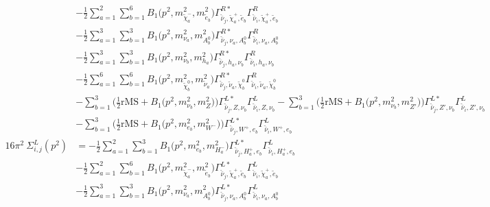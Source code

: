 \begin{itemize}
\begin{align}
 &-\frac{1}{2} \sum_{a=1}^{2}\sum_{b=1}^{6}{B_1\Big(p^{2},m^2_{\tilde{\chi}^-_{{a}}},m^2_{\tilde{e}_{{b}}}\Big)} {\Gamma^{R*}_{\check{\bar{\nu}}_{{j}},\tilde{\chi}^+_{{a}},\tilde{e}_{{b}}}} {\Gamma^R_{\check{\bar{\nu}}_{{i}},\tilde{\chi}^+_{{a}},\tilde{e}_{{b}}}}  \nonumber \\ 
 &-\frac{1}{2} \sum_{a=1}^{3}\sum_{b=1}^{3}{B_1\Big(p^{2},m^2_{\nu_{{a}}},m^2_{A^0_{{b}}}\Big)} {\Gamma^{R*}_{\check{\bar{\nu}}_{{j}},\nu_{{a}},A^0_{{b}}}} {\Gamma^R_{\check{\bar{\nu}}_{{i}},\nu_{{a}},A^0_{{b}}}}  \nonumber \\ 
 &-\frac{1}{2} \sum_{a=1}^{3}\sum_{b=1}^{3}{B_1\Big(p^{2},m^2_{\nu_{{b}}},m^2_{h_{{a}}}\Big)} {\Gamma^{R*}_{\check{\bar{\nu}}_{{j}},h_{{a}},\nu_{{b}}}} {\Gamma^R_{\check{\bar{\nu}}_{{i}},h_{{a}},\nu_{{b}}}}  \nonumber \\ 
 &-\frac{1}{2} \sum_{a=1}^{6}\sum_{b=1}^{6}{B_1\Big(p^{2},m^2_{\tilde{\chi}^0_{{b}}},m^2_{\tilde{\nu}_{{a}}}\Big)} {\Gamma^{R*}_{\check{\bar{\nu}}_{{j}},\tilde{\nu}_{{a}},\tilde{\chi}^0_{{b}}}} {\Gamma^R_{\check{\bar{\nu}}_{{i}},\tilde{\nu}_{{a}},\tilde{\chi}^0_{{b}}}}  \nonumber \\ 
 &- \sum_{b=1}^{3}\Big(\frac{1}{2} \text{rMS}  + {B_1\Big(p^{2},m^2_{\nu_{{b}}},m^2_{Z}\Big)}\Big){\Gamma^{L*}_{\check{\bar{\nu}}_{{j}},Z,\nu_{{b}}}} {\Gamma^L_{\check{\bar{\nu}}_{{i}},Z,\nu_{{b}}}}  - \sum_{b=1}^{3}\Big(\frac{1}{2} \text{rMS}  + {B_1\Big(p^{2},m^2_{\nu_{{b}}},m^2_{{Z'}}\Big)}\Big){\Gamma^{L*}_{\check{\bar{\nu}}_{{j}},{Z'},\nu_{{b}}}} {\Gamma^L_{\check{\bar{\nu}}_{{i}},{Z'},\nu_{{b}}}}  \nonumber \\ 
 &- \sum_{b=1}^{3}\Big(\frac{1}{2} \text{rMS}  + {B_1\Big(p^{2},m^2_{e_{{b}}},m^2_{W^-}\Big)}\Big){\Gamma^{L*}_{\check{\bar{\nu}}_{{j}},W^+,e_{{b}}}} {\Gamma^L_{\check{\bar{\nu}}_{{i}},W^+,e_{{b}}}}  \\ 
16\pi^2 \ \Sigma^L_{i,j}(p^2) &= -\frac{1}{2} \sum_{a=1}^{2}\sum_{b=1}^{3}{B_1\Big(p^{2},m^2_{e_{{b}}},m^2_{H^-_{{a}}}\Big)} {\Gamma^{L*}_{\check{\bar{\nu}}_{{j}},H^+_{{a}},e_{{b}}}} {\Gamma^L_{\check{\bar{\nu}}_{{i}},H^+_{{a}},e_{{b}}}}  \nonumber \\ 
 &-\frac{1}{2} \sum_{a=1}^{2}\sum_{b=1}^{6}{B_1\Big(p^{2},m^2_{\tilde{\chi}^-_{{a}}},m^2_{\tilde{e}_{{b}}}\Big)} {\Gamma^{L*}_{\check{\bar{\nu}}_{{j}},\tilde{\chi}^+_{{a}},\tilde{e}_{{b}}}} {\Gamma^L_{\check{\bar{\nu}}_{{i}},\tilde{\chi}^+_{{a}},\tilde{e}_{{b}}}}  \nonumber \\ 
 &-\frac{1}{2} \sum_{a=1}^{3}\sum_{b=1}^{3}{B_1\Big(p^{2},m^2_{\nu_{{a}}},m^2_{A^0_{{b}}}\Big)} {\Gamma^{L*}_{\check{\bar{\nu}}_{{j}},\nu_{{a}},A^0_{{b}}}} {\Gamma^L_{\check{\bar{\nu}}_{{i}},\nu_{{a}},A^0_{{b}}}}  \nonumber \\ 

\end{align}
\end{itemize}
